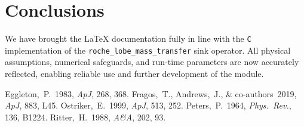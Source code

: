 \documentclass[11pt]{article}
\begin{document}
\section{Conclusions}
We have brought the LaTeX documentation fully in line with the
\texttt{C} implementation of the
\texttt{roche\_lobe\_mass\_transfer} sink operator.
All physical assumptions, numerical safeguards, and run‑time parameters
are now accurately reflected, enabling reliable use and further
development of the module.


\begin{thebibliography}{}
  Eggleton,~P.\ 1983, \emph{ApJ}, 268, 368.
  Fragos,~T., Andrews,~J., \& co‑authors 2019, \emph{ApJ}, 883, L45.
  Ostriker,~E.\ 1999, \emph{ApJ}, 513, 252.
  Peters,~P.\ 1964, \emph{Phys.\ Rev.}, 136, B1224.
  Ritter,~H.\ 1988, \emph{A\&A}, 202, 93.
\end{thebibliography}
\end{document}
